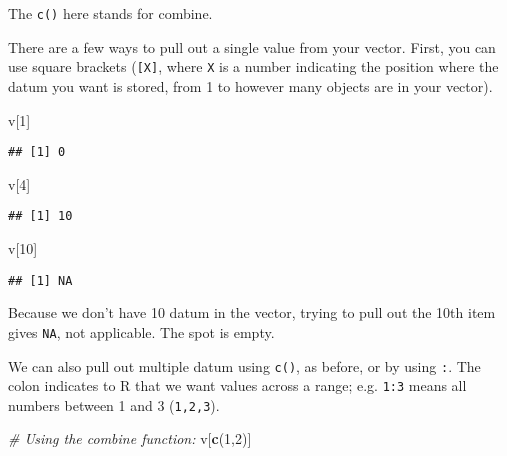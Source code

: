 \documentclass[]{article}
\newenvironment{Shaded}{\begin{snugshade}}{\end{snugshade}}
\newcommand{\KeywordTok}[1]{\textcolor[rgb]{0.13,0.29,0.53}{\textbf{#1}}}
\newcommand{\DecValTok}[1]{\textcolor[rgb]{0.00,0.00,0.81}{#1}}
\newcommand{\CommentTok}[1]{\textcolor[rgb]{0.56,0.35,0.01}{\textit{#1}}}
\newcommand{\NormalTok}[1]{#1}
\begin{document}
The \texttt{c()} here stands for combine.

There are a few ways to pull out a single value from your vector. First,
you can use square brackets (\texttt{{[}X{]}}, where \texttt{X} is a
number indicating the position where the datum you want is stored, from
1 to however many objects are in your vector).

\begin{Shaded}
\begin{Highlighting}[]
\NormalTok{v[}\DecValTok{1}\NormalTok{]}
\end{Highlighting}
\end{Shaded}

\begin{verbatim}
## [1] 0
\end{verbatim}

\begin{Shaded}
\begin{Highlighting}[]
\NormalTok{v[}\DecValTok{4}\NormalTok{]}
\end{Highlighting}
\end{Shaded}

\begin{verbatim}
## [1] 10
\end{verbatim}

\begin{Shaded}
\begin{Highlighting}[]
\NormalTok{v[}\DecValTok{10}\NormalTok{]}
\end{Highlighting}
\end{Shaded}

\begin{verbatim}
## [1] NA
\end{verbatim}

Because we don't have 10 datum in the vector, trying to pull out the
10th item gives \texttt{NA}, not applicable. The spot is empty.

We can also pull out multiple datum using \texttt{c()}, as before, or by
using \texttt{:}. The colon indicates to R that we want values across a
range; e.g. \texttt{1:3} means all numbers between 1 and 3
(\texttt{1,2,3}).

\begin{Shaded}
\begin{Highlighting}[]
\CommentTok{# Using the combine function:}
\NormalTok{v[}\KeywordTok{c}\NormalTok{(}\DecValTok{1}\NormalTok{,}\DecValTok{2}\NormalTok{)]}
\end{Highlighting}
\end{Shaded}
\end{document}
